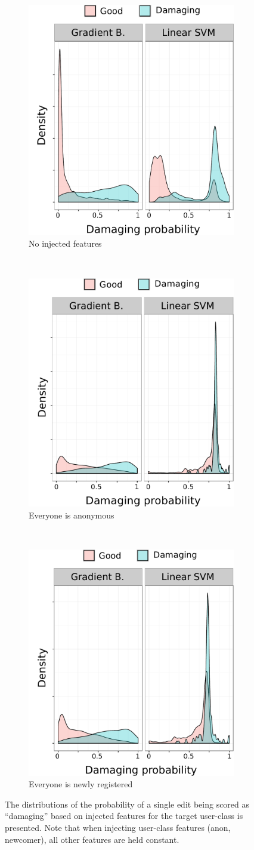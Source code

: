 \begin{figure}[p]
\centering
\begin{subfigure}[t]{\columnwidth}
  \centering
  \includegraphics[width=.3\textwidth]{figures/natural_damaging_gb_vs_svc}
  \caption{No injected features}
  \label{fig:natural_damaging_gb_bs_svc}
\end{subfigure}~~
\begin{subfigure}[t]{\columnwidth}
  \centering
  \includegraphics[width=.3\textwidth]{figures/anon_damaging_gb_vs_svc}
  \caption{Everyone is anonymous}
  \label{fig:anon_damaging_gb_bs_svc}
\end{subfigure}~~
\begin{subfigure}[t]{\columnwidth}
  \centering
  \includegraphics[width=.3\textwidth]{figures/newcomer_damaging_gb_vs_svc}
  \caption{Everyone is newly registered}
  \label{fig:newcomer_damaging_gb_bs_svc}
\end{subfigure}
\caption{The distributions of the probability of a single edit being scored as ``damaging'' based on injected features for the target user-class is presented.  Note that when injecting user-class features (anon, newcomer), all other features are held constant.}
\label{fig:prediction_error_for_anons_and_newcomers}
\end{figure}

